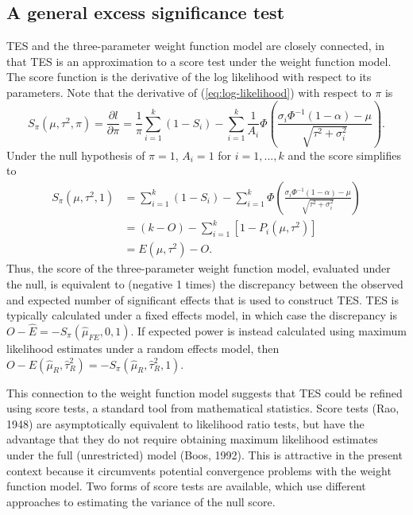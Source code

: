 \documentclass[man,floatsintext]{apa6}
\begin{document}
\hypertarget{a-general-excess-significance-test}{%
\subsection{A general excess significance test}\label{a-general-excess-significance-test}}

TES and the three-parameter weight function model are closely connected, in that TES is an approximation to a score test under the weight function model.
The score function is the derivative of the log likelihood with respect to its parameters.
Note that the derivative of (\ref{eq:log-likelihood}) with respect to \(\pi\) is
\begin{equation}
S_\pi(\mu, \tau^2, \pi) = \frac{\partial l}{\partial \pi} = \frac{1}{\pi} \sum_{i=1}^k (1 - S_i) - \sum_{i=1}^k \frac{1}{A_i} \Phi\left( \frac{\sigma_i \Phi^{-1}(1 - \alpha) - \mu}{\sqrt{\tau^2 + \sigma_i^2}}\right).
\label{eq:score-pi}
\end{equation}
Under the null hypothesis of \(\pi = 1\), \(A_i = 1\) for \(i = 1,...,k\) and the score simplifies to
\[
\begin{aligned}
S_\pi(\mu, \tau^2, 1) &= \sum_{i=1}^k (1 - S_i) - \sum_{i=1}^k \Phi\left( \frac{\sigma_i \Phi^{-1}(1 - \alpha) - \mu}{\sqrt{\tau^2 + \sigma_i^2}}\right) \\
&= (k - O) - \sum_{i=1}^k \left[1 - P_i(\mu, \tau^2)\right] \\
&= E(\mu,\tau^2) - O.
\end{aligned}
\]
Thus, the score of the three-parameter weight function model, evaluated under the null, is equivalent to (negative 1 times) the discrepancy between the observed and expected number of significant effects that is used to construct TES.
TES is typically calculated under a fixed effects model, in which case the discrepancy is \(O - \hat{E} = - S_\pi(\hat\mu_{FE}, 0, 1)\). If expected power is instead calculated using maximum likelihood estimates under a random effects model, then \(O - E(\hat\mu_R, \hat\tau^2_R) = - S_\pi(\hat\mu_R, \hat\tau^2_R, 1)\).

This connection to the weight function model suggests that TES could be refined using score tests, a standard tool from mathematical statistics. Score tests (Rao, 1948) are asymptotically equivalent to likelihood ratio tests, but have the advantage that they do not require obtaining maximum likelihood estimates under the full (unrestricted) model (Boos, 1992). This is attractive in the present context because it circumvents potential convergence problems with the weight function model. Two forms of score tests are available, which use different approaches to estimating the variance of the null score.
\end{document}
